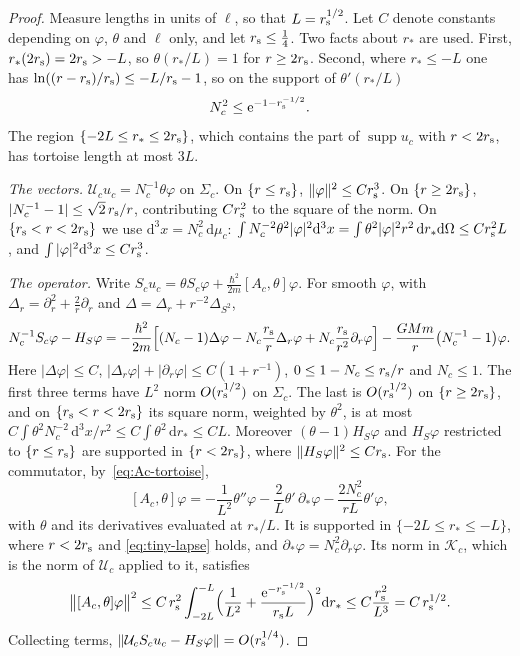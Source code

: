 \documentclass[%
 aip,
 jmp,
 amsmath,amssymb,
 reprint, onecolumn
]{revtex4-1}
\theoremstyle{definition}
\theoremstyle{remark}
\newcommand{\K}{\mathcal{K}}
\newcommand{\rmd}{\mathrm{d}}
\newcommand{\rme}{\mathrm{e}}
\DeclareMathOperator{\supp}{supp}
\begin{document}
\begin{proof}
Measure lengths in units of $\ell$, so that $L=r_{\rm s}^{1/2}$. Let $C$
denote constants depending on $\varphi$, $\theta$ and $\ell$ only, and
let $r_{\rm s}\leq\frac14$. Two facts about $r_*$ are used. First,
$r_*(2r_{\rm s})=2r_{\rm s}>-L$, so $\theta(r_*/L)=1$ for $r\geq
2r_{\rm s}$. Second, where $r_*\leq-L$ one has $\ln((r-r_{\rm s})/r_{\rm s})
\leq-L/r_{\rm s}-1$, so on the support of $\theta'(r_*/L)$
\begin{equation}\label{eq:tiny-lapse}
N_c^2\leq\rme^{-1-r_{\rm s}^{-1/2}} .
\end{equation}
The region $\{-2L\leq r_*\leq2r_{\rm s}\}$, which contains the part of
$\supp u_c$ with $r<2r_{\rm s}$, has tortoise length at most $3L$.

\emph{The vectors.} $\mathcal{U}_cu_c=N_c^{-1}\theta\varphi$ on
$\Sigma_c$. On $\{r\leq r_{\rm s}\}$, $\|\varphi\|^2\leq Cr_{\rm s}^3$. On
$\{r\geq2r_{\rm s}\}$, $|N_c^{-1}-1|\leq\sqrt2\,r_{\rm s}/r$, contributing
$Cr_{\rm s}^2$ to the square of the norm. On $\{r_{\rm s}<r<2r_{\rm s}\}$
we use $\rmd^3x=N_c^2\,\rmd\mu_c$: $\int N_c^{-2}\theta^2|\varphi|^2
\rmd^3x=\int\theta^2|\varphi|^2r^2\,\rmd r_*\rmd\Omega\leq Cr_{\rm s}^2L$,
and $\int|\varphi|^2\rmd^3x\leq Cr_{\rm s}^3$.

\emph{The operator.} Write $S_cu_c=\theta S_c\varphi+\frac{\hbar^2}{2m}
[A_c,\theta]\varphi$. For smooth $\varphi$, with $\Delta_r=\partial_r^2+
\frac2r\partial_r$ and $\Delta=\Delta_r+r^{-2}\Delta_{S^2}$,
\[
N_c^{-1}S_c\varphi-H_S\varphi=-\frac{\hbar^2}{2m}\Bigl[(N_c-1)\Delta
\varphi-N_c\frac{r_{\rm s}}{r}\Delta_r\varphi+N_c\frac{r_{\rm s}}{r^2}
\partial_r\varphi\Bigr]-\frac{GMm}{r}\bigl(N_c^{-1}-1\bigr)\varphi .
\]
Here $|\Delta\varphi|\leq C$, $|\Delta_r\varphi|+|\partial_r\varphi|
\leq C(1+r^{-1})$, $0\leq1-N_c\leq r_{\rm s}/r$ and $N_c\leq1$. The
first three terms have $L^2$ norm $O(r_{\rm s}^{1/2})$ on $\Sigma_c$. The
last is $O(r_{\rm s}^{1/2})$ on $\{r\geq2r_{\rm s}\}$, and on
$\{r_{\rm s}<r<2r_{\rm s}\}$ its square norm, weighted by $\theta^2$, is
at most $C\int\theta^2N_c^{-2}\,\rmd^3x/r^2\leq C\int\theta^2\,\rmd r_*
\leq CL$. Moreover $(\theta-1)H_S\varphi$ and $H_S\varphi$ restricted to
$\{r\leq r_{\rm s}\}$ are supported in $\{r<2r_{\rm s}\}$, where
$\|H_S\varphi\|^2\leq Cr_{\rm s}$. For the commutator,
by~\eqref{eq:Ac-tortoise},
\[
[A_c,\theta]\varphi=-\frac{1}{L^2}\theta''\varphi-\frac2L\theta'\,
\partial_*\varphi-\frac{2N_c^2}{rL}\theta'\varphi,
\]
with $\theta$ and its derivatives evaluated at $r_*/L$. It is supported
in $\{-2L\leq r_*\leq-L\}$, where $r<2r_{\rm s}$ and
\eqref{eq:tiny-lapse} holds, and $\partial_*\varphi=N_c^2\partial_r
\varphi$. Its norm in $\K_c$, which is the norm of $\mathcal{U}_c$
applied to it, satisfies
\[
\bigl\|[A_c,\theta]\varphi\bigr\|^2\leq C\,r_{\rm s}^2\int_{-2L}^{-L}
\Bigl(\frac{1}{L^2}+\frac{\rme^{-r_{\rm s}^{-1/2}}}{r_{\rm s}L}\Bigr)^2
\rmd r_*\leq C\frac{r_{\rm s}^2}{L^3}=C\,r_{\rm s}^{1/2}.
\]
Collecting terms, $\|\mathcal{U}_cS_cu_c-H_S\varphi\|=O(r_{\rm s}^{1/4})$.
\end{proof}
\end{document}
